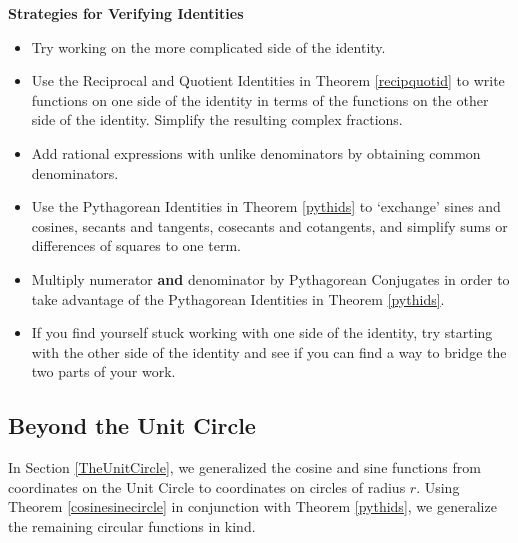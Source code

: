 \colorbox{ResultColor}{\bbm

\medskip

\centerline{\textbf{Strategies for Verifying Identities}} 

\begin{itemize}

\item  Try working on the more complicated side of the identity.

\item Use the Reciprocal and Quotient Identities in Theorem \ref{recipquotid} to write functions on one side of the identity in terms of the functions on the other side of the identity.  Simplify the resulting complex fractions.

\item Add rational expressions with unlike denominators by obtaining common denominators.

\item  Use the Pythagorean Identities in Theorem \ref{pythids} to `exchange' sines and cosines, secants and tangents, cosecants and cotangents, and simplify sums or differences of squares to one term. 

\item Multiply numerator \textbf{and} denominator by Pythagorean
Conjugates in order to take advantage of the Pythagorean Identities in  Theorem \ref{pythids}.

\item If you find yourself stuck working with one side of the identity, try starting with the other side of the identity and see if you can find a way to bridge the two parts of your work.


\end{itemize}

\ebm}

\subsection{Beyond the Unit Circle}
\label{circularfunctionsbeyond}

In Section \ref{TheUnitCircle}, we generalized the cosine and sine functions from coordinates on the Unit Circle to coordinates on circles of radius $r$.  Using Theorem \ref{cosinesinecircle} in conjunction with Theorem \ref{pythids}, we generalize the remaining circular functions in kind.

\smallskip

